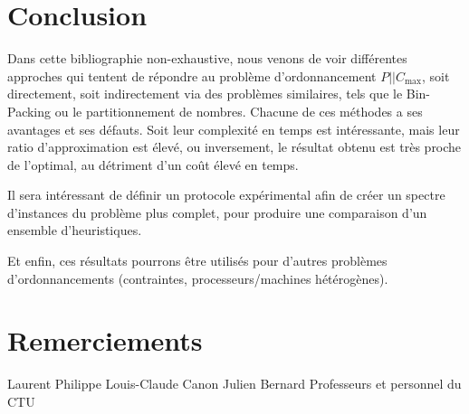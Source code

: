 \documentclass[a4paper,12pt]{report}
\theoremstyle{plain}				%
\theoremstyle{definition}				%
\newcommand\problemGrahamP{$P||C_{\max}$\xspace}
\begin{document}
\section{Conclusion} \label{sec:conclusion}

Dans cette bibliographie non-exhaustive, nous venons de voir
différentes approches qui tentent de répondre au problème
d'ordonnancement \problemGrahamP, soit directement, soit indirectement
via des problèmes similaires, tels que le Bin-Packing ou le
partitionnement de nombres.
Chacune de ces méthodes a ses avantages et ses défauts.
Soit leur complexité en temps est intéressante, mais leur ratio
d'approximation est élevé, ou inversement, le résultat obtenu est très
proche de l'optimal, au détriment d'un coût élevé en temps.

Il sera intéressant de définir un protocole expérimental afin de créer
un spectre d'instances du problème plus complet, pour produire
une comparaison d'un ensemble d'heuristiques.

Et enfin, ces résultats pourrons être utilisés pour d'autres problèmes
d'ordonnancements (contraintes, processeurs/machines hétérogènes).

\section{Remerciements} \label{sec:remerciements}
Laurent Philippe
Louis-Claude Canon
Julien Bernard
Professeurs et personnel du CTU


\medskip


\end{document}
